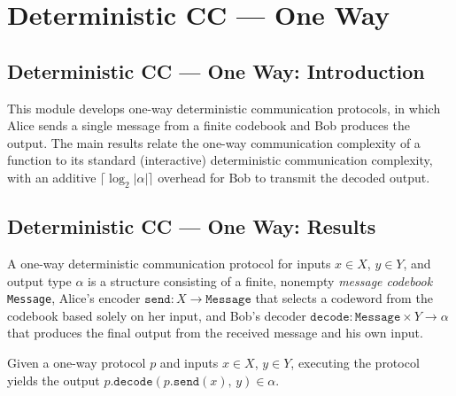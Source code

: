 \section{Deterministic CC --- One Way}
\subsection*{Deterministic CC --- One Way: Introduction}

This module develops one-way deterministic communication protocols, in which Alice sends
a single message from a finite codebook and Bob produces the output.  The main results
relate the one-way communication complexity of a function to its standard (interactive)
deterministic communication complexity, with an additive $\lceil \log_2 |\alpha| \rceil$
overhead for Bob to transmit the decoded output.

\subsection*{Deterministic CC --- One Way: Results}

\begin{definition}
\label{CommunicationComplexity.Deterministic.OneWay.Protocol}
\leanok
A one-way deterministic communication protocol for inputs $x \in X$, $y \in Y$, and
output type $\alpha$ is a structure consisting of a finite, nonempty \emph{message
codebook} \texttt{Message}, Alice's encoder $\mathtt{send} : X \to \mathtt{Message}$
that selects a codeword from the codebook based solely on her input, and Bob's decoder
$\mathtt{decode} : \mathtt{Message} \times Y \to \alpha$ that produces the final output
from the received message and his own input.
\end{definition}

\begin{definition}
\label{CommunicationComplexity.Deterministic.OneWay.Protocol.run}
\leanok
{}
Given a one-way protocol $p$ and inputs $x \in X$, $y \in Y$, executing the protocol
yields the output $p.\mathtt{decode}(p.\mathtt{send}(x),\, y) \in \alpha$.
\end{definition}

